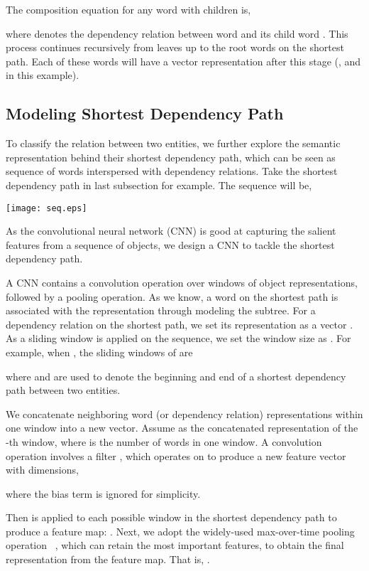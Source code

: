 \documentclass[11pt]{article}
\begin{document}
The composition equation for any word  with
children  is,

where  denotes the dependency relation between word  and its child word .
This process continues recursively from leaves up to the root words on the shortest path. Each of these words will have a vector representation after this stage (,  and  in this example).




\subsection{Modeling Shortest Dependency Path}
To classify the relation between two entities, we further explore the semantic representation behind their shortest dependency path, which can be seen as  sequence of words interspersed with dependency relations.
Take the shortest dependency path in last subsection for example. The sequence  will be,
\begin{center}
\texttt{[image: seq.eps]}
\end{center}

As the convolutional neural network (CNN) is good at capturing the salient features from a sequence of objects, we design a CNN to tackle the shortest dependency path.


A CNN contains a convolution operation over  windows of object representations, followed by a pooling operation.
As we know, a word  on the shortest path is associated with the representation  through modeling the subtree.
For a dependency relation  on the shortest path, we set its representation as a vector .
As a sliding window is applied on the sequence, we set the window size as .
For example, when , the sliding windows of  are

where  and  are used to denote the beginning and end of a shortest dependency path between two entities.

We concatenate  neighboring word (or dependency relation) representations within one window into a new vector.
Assume  as the concatenated representation of the -th window, where  is the number of words in one window.
 A convolution operation involves a filter , which operates on   to produce a new feature vector  with  dimensions,
 
where the bias term is ignored for simplicity.

Then  is applied to each possible window in the shortest dependency path  to produce a feature map:
.
Next, we adopt the widely-used max-over-time pooling operation ~\cite{collobert2011natural}, which can retain the most important features, to obtain the final representation   from the feature map.
That is, .
\end{document}
